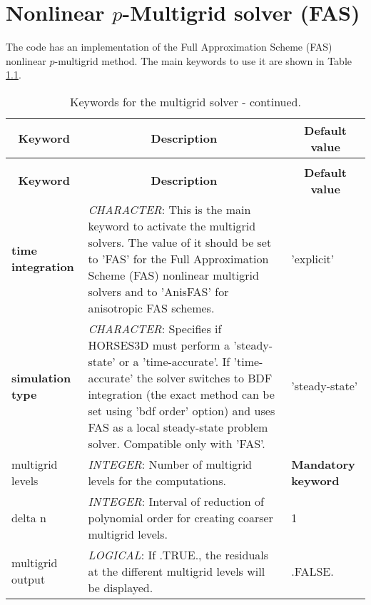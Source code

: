 \documentclass[a4paper,10pt]{report}
\begin{document}
\chapter{Nonlinear $p$-Multigrid solver (FAS)}

The code has an implementation of the Full Approximation Scheme (FAS) nonlinear $p$-multigrid method. The main keywords to use it are shown in Table \ref{tab:multigridKey}.

\begin{longtable}{|p{4cm}|p{10cm}|p{2.2cm}|}
\caption{Keywords for the multigrid solver.} \label{tab:multigridKey} \\
\hline
\multicolumn{1}{|c|}{\textbf{Keyword}} & \multicolumn{1}{c|}{\textbf{Description}} & \multicolumn{1}{c|}{\textbf{Default value}} \\ \hline
\endfirsthead

\caption{Keywords for the multigrid solver - continued.} \\
\hline
\multicolumn{1}{|c|}{\textbf{Keyword}} & \multicolumn{1}{c|}{\textbf{Description}} & \multicolumn{1}{c|}{\textbf{Default value}} \\ \hline
\endhead

\textbf{time integration} & \textit{CHARACTER}: This is the main keyword to activate the multigrid solvers. The value of it should be set to 'FAS' for the Full Approximation Scheme (FAS) nonlinear multigrid  solvers and to 'AnisFAS' for anisotropic FAS schemes. & 'explicit' \\ \hline

\textbf{simulation type} & \textit{CHARACTER}: Specifies if HORSES3D must perform a ’steady-state’ or a ’time-accurate’. If 'time-accurate' the solver switches to BDF integration (the exact method can be set using 'bdf order' option) and uses FAS as a local steady-state problem solver. Compatible only with 'FAS'. & 'steady-state' \\ \hline

multigrid levels & \textit{INTEGER}: Number of multigrid levels for the computations. & \textbf{Mandatory keyword} \\ \hline

delta n          & \textit{INTEGER}: Interval of reduction of polynomial order for creating coarser multigrid levels.& 1 \\ \hline

multigrid output & \textit{LOGICAL}: If .TRUE., the residuals at the different multigrid levels will be displayed. & .FALSE. \\ \hline


\end{longtable}
\end{document}
